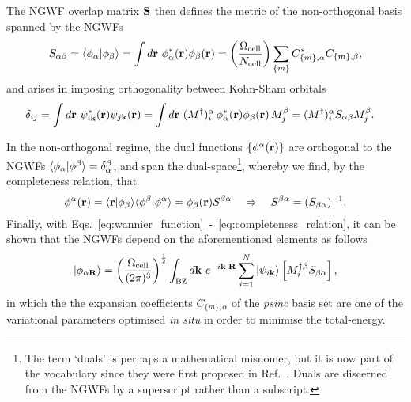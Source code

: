{
The NGWF overlap matrix ${\bf S}$  
then defines the metric 
of the non-orthogonal basis 
spanned by the NGWFs
%
\begin{align}
S_{\alpha\beta}=\langle\phi_\alpha\vert\phi_\beta\rangle
= \int d{\bf r}\ \phi^*_\alpha({\bf r})\phi_\beta({\bf r}) = \left(\frac{\Omega_\textrm{cell}}{N_\textrm{cell}}\right) \sum_{\{m\}}C^*_{\{m\},\alpha}C_{\{m\},\beta}, 
\end{align}
%
and arises in imposing orthogonality between Kohn-Sham orbitals 
%
\begin{align}
\delta_{ij}&=\int d{\bf r}\ \psi^*_{i{\bf k}}({\bf r})\psi_{j{\bf k}}({\bf r}) =  \int d{\bf r}\ (M^\dagger)^\alpha_i\, \phi^*_\alpha({\bf r})\phi_\beta({\bf r})\, M^\beta_j =(M^\dagger)^\alpha_i S_{\alpha\beta}M^\beta_j.
\end{align}

In the non-orthogonal regime, 
the dual functions $\{\phi^\alpha({\bf r})\}$ 
are orthogonal to the NGWFs 
$\langle\phi_\alpha\vert\phi^\beta\rangle=\delta_\alpha^\beta$, 
and span the 
dual-space\footnote{{The term `duals' is perhaps a 
mathematical misnomer, but it is now part of the 
vocabulary since they were first proposed in Ref.~\cite{PhysRevA.43.5770}}.
%
Duals are discerned from the NGWFs by 
a superscript rather than a subscript.}, 
whereby we find, by the completeness relation, that
%
\begin{equation}
\phi^\alpha({\bf r})=\langle{\bf r}\vert\phi_\beta\rangle\langle\phi^\beta\vert\phi^\alpha\rangle=\phi_\beta({\bf r})S^{\beta\alpha}
\quad\Rightarrow\quad
S^{\beta\alpha}=(S_{\beta\alpha})^{-1}.
\label{eq:completeness_relation}
\end{equation}
%
Finally, with Eqs.~\eqref{eq:wannier_function}~-~\eqref{eq:completeness_relation}, 
it can be shown that the NGWFs 
depend on the aforementioned elements as follows
%
\begin{equation}
\vert\phi_{\alpha{\bf R}}\rangle=\left(\frac{\Omega_\textrm{cell}}{(2\pi)^3}\right)^{\frac{1}{2}}
\int_\textrm{BZ} d{\bf k}\ e^{-i{\bf k}\cdot{\bf R}} 
\sum_{i=1}^N \vert\psi_{i{\bf k}}\rangle\left[M_i^{\dagger\beta}S_{\beta\alpha}\right],
\end{equation}
%
in which the the expansion coefficients 
$C_{\{m\},\alpha}$ 
of the {\it psinc} basis set 
are one of the variational parameters 
optimised {\it in situ} 
in order to minimise the total-energy.}



